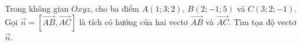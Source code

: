 \begin{ex}
Trong không gian $Oxyz$, cho ba điểm $A(1;3;2)$, $B(2;-1;5)$ và $C(3;2;-1)$. Gọi $\vec n=\left[\overrightarrow{AB},\overrightarrow{AC}\right]$ là tích có hướng của hai vectơ $\overrightarrow{AB}$ và $\overrightarrow{AC}$. Tìm tọa độ vectơ $\vec n$.
\end{ex}
